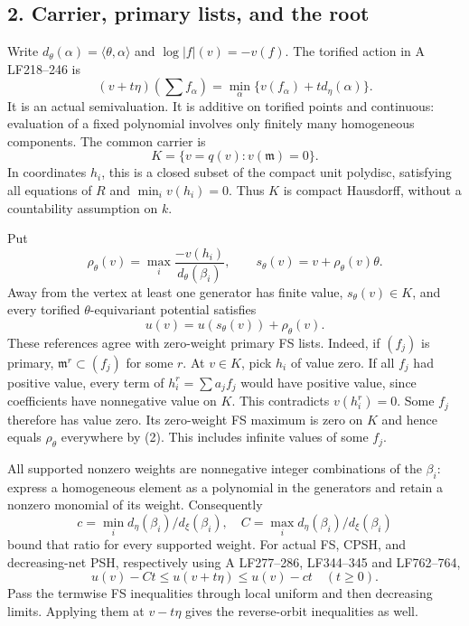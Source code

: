 \documentclass[
  11pt,
]{article}
\begin{document}
\subsection{2. Carrier, primary lists, and the
root}\label{carrier-primary-lists-and-the-root}

Write \(d_\theta(\alpha)=\langle\theta,\alpha\rangle\) and
\(\log|f|(v)=-v(f)\). The torified action in A LF218--246 is \[
 (v+t\eta)(\textstyle\sum f_\alpha)=\min_\alpha\{v(f_\alpha)+t d_\eta(\alpha)\}.
\] It is an actual semivaluation. It is additive on torified points and
continuous: evaluation of a fixed polynomial involves only finitely many
homogeneous components. The common carrier is
\[ K=\{v=q(v):v(\mathfrak m)=0\}.\] In coordinates \(h_i\), this is a
closed subset of the compact unit polydisc, satisfying all equations of
\(R\) and \(\min_i v(h_i)=0\). Thus \(K\) is compact Hausdorff, without
a countability assumption on \(k\).

Put \[ \rho_\theta(v)=\max_i\frac{-v(h_i)}{d_\theta(\beta_i)},\qquad
 s_\theta(v)=v+\rho_\theta(v)\theta.\] Away from the vertex at least one
generator has finite value, \(s_\theta(v)\in K\), and every torified
\(\theta\)-equivariant potential satisfies
\[ u(v)=u(s_\theta(v))+\rho_\theta(v).                                      \tag{2}\]
These references agree with zero-weight primary FS lists. Indeed, if
\((f_j)\) is primary, \(\mathfrak m^r\subset(f_j)\) for some \(r\). At
\(v\in K\), pick \(h_i\) of value zero. If all \(f_j\) had positive
value, every term of \(h_i^r=\sum a_jf_j\) would have positive value,
since coefficients have nonnegative value on \(K\). This contradicts
\(v(h_i^r)=0\). Some \(f_j\) therefore has value zero. Its zero-weight
FS maximum is zero on \(K\) and hence equals \(\rho_\theta\) everywhere
by (2). This includes infinite values of some \(f_j\).

All supported nonzero weights are nonnegative integer combinations of
the \(\beta_i\): express a homogeneous element as a polynomial in the
generators and retain a nonzero monomial of its weight. Consequently
\[ c=\min_i d_\eta(\beta_i)/d_\xi(\beta_i),\quad
 C=\max_i d_\eta(\beta_i)/d_\xi(\beta_i)\] bound that ratio for every
supported weight. For actual FS, CPSH, and decreasing-net PSH,
respectively using A LF277--286, LF344--345 and LF762--764,
\[ u(v)-Ct\leq u(v+t\eta)\leq u(v)-ct\quad(t\geq0).                       \tag{3}\]
Pass the termwise FS inequalities through local uniform and then
decreasing limits. Applying them at \(v-t\eta\) gives the reverse-orbit
inequalities as well.
\end{document}
